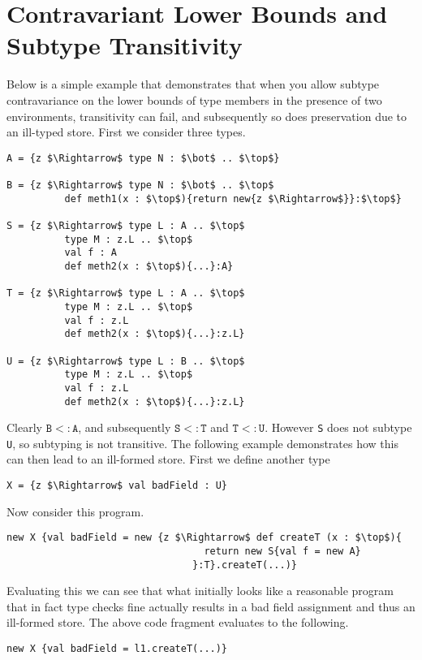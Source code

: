 \documentclass{llncs}
\numberwithin{subcase}{casethm}
\numberwithin{casethm}{theorem}
\numberwithin{casethm}{lemma}
\begin{document}
\section{Contravariant Lower Bounds and Subtype Transitivity}
Below is a simple example that demonstrates that 
when you allow subtype contravariance on the lower bounds 
of type members in the presence of two environments, 
transitivity can fail, and subsequently so does preservation
due to an ill-typed store. First we consider three types.
\begin{lstlisting}[mathescape, style=custom_lang]
A = {z $\Rightarrow$ type N : $\bot$ .. $\top$}

B = {z $\Rightarrow$ type N : $\bot$ .. $\top$
          def meth1(x : $\top$){return new{z $\Rightarrow$}}:$\top$}
         
S = {z $\Rightarrow$ type L : A .. $\top$
          type M : z.L .. $\top$
          val f : A
          def meth2(x : $\top$){...}:A}
         
T = {z $\Rightarrow$ type L : A .. $\top$
          type M : z.L .. $\top$
          val f : z.L
          def meth2(x : $\top$){...}:z.L}
         
U = {z $\Rightarrow$ type L : B .. $\top$
          type M : z.L .. $\top$
          val f : z.L
          def meth2(x : $\top$){...}:z.L}
\end{lstlisting}
Clearly $\texttt{B} <: \texttt{A}$, and subsequently
$\texttt{S} <: \texttt{T}$ and $\texttt{T} <: \texttt{U}$. 
However \texttt{S} does not subtype \texttt{U}, so subtyping 
is not transitive. The following example demonstrates how this 
can then lead to an ill-formed store. First we define another type
\begin{lstlisting}[mathescape, style=custom_lang]
X = {z $\Rightarrow$ val badField : U}
\end{lstlisting}
Now consider this program.
\begin{lstlisting}[mathescape, style=custom_lang]
new X {val badField = new {z $\Rightarrow$ def createT (x : $\top$){
                                  return new S{val f = new A}
                                }:T}.createT(...)}
\end{lstlisting}
Evaluating this we can see that what initially 
looks like a reasonable program that in fact type 
checks fine actually results in a bad field assignment 
and thus an ill-formed store. The above code fragment 
evaluates to the following.
\begin{lstlisting}[mathescape, style=custom_lang]
new X {val badField = l1.createT(...)}
\end{lstlisting}
\end{document}
